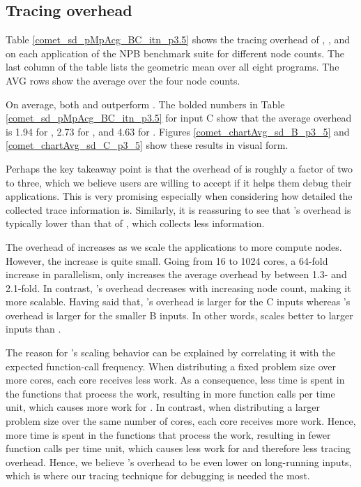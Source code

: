 

\subsection{Tracing overhead}
\label{subsec:lowtoh}



Table \ref{comet_sd_pMpAcg_BC_itn_p3.5} shows the tracing overhead of \parlotm, \parlota, and \callgrind on each application of the NPB benchmark suite for different node counts. The last column of the table lists the geometric mean over all eight programs. The AVG rows show the average over the four node counts.

On average, both \parlotm and \parlota outperform \callgrind. The bolded numbers in Table \ref{comet_sd_pMpAcg_BC_itn_p3.5} for input C show that the average overhead is 1.94 for \parlotm, 2.73 for \parlota, and 4.63 for \callgrind. Figures \ref{comet_chartAvg_sd_B_p3_5} and \ref{comet_chartAvg_sd_C_p3_5} show these results in visual form.

Perhaps the key takeaway point is that the overhead of \parlot is roughly a factor of two to three, which we believe users are willing to accept if it helps them debug their applications. This is very promising especially when considering how detailed the collected trace information is. Similarly, it is reassuring to see that \parlot 's overhead is typically lower than that of \callgrind, which collects less information.

The overhead of \parlot increases as we scale the applications to more compute nodes. However, the increase is quite small. Going from 16 to 1024 cores, a 64-fold increase in parallelism, only increases the average overhead by between 1.3- and 2.1-fold. In contrast, \callgrind 's overhead decreases with increasing node count, making it more scalable. Having said that, \callgrind 's overhead is larger for the C inputs whereas \parlot 's overhead is larger for the smaller B inputs. In other words, \parlot scales better to larger inputs than \callgrind.

The reason for \parlot 's scaling behavior can be explained by correlating it with the expected function-call frequency. When distributing a fixed problem size over more cores, each core receives less work. As a consequence, less time is spent in the functions that process the work, resulting in more function calls per time unit, which causes more work for \parlot. In contrast, when distributing a larger problem size over the same number of cores, each core receives more work. Hence, more time is spent in the functions that process the work, resulting in fewer function calls per time unit, which causes less work for \parlot and therefore less tracing overhead. Hence, we believe \parlot 's overhead to be even lower on long-running inputs, which is where our tracing technique for debugging is needed the most.

